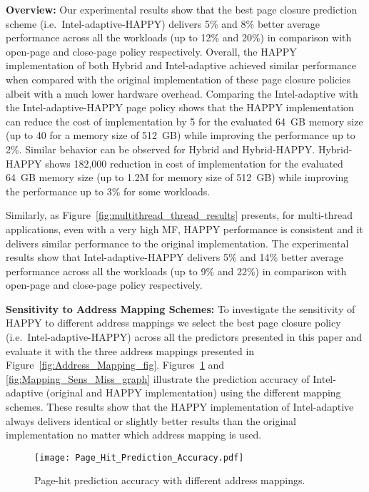 {\bf Overview:} Our experimental results show that the best page closure prediction scheme (i.e.\ Intel-adaptive-HAPPY) delivers 5\% and 8\% better average performance across all the workloads (up to 12\% and 20\%) in comparison with open-page and close-page policy respectively. Overall, the HAPPY implementation of both Hybrid and Intel-adaptive achieved similar performance when compared with the original implementation of these page closure policies albeit with a much lower hardware overhead. Comparing the Intel-adaptive with the Intel-adaptive-HAPPY page policy shows that the HAPPY implementation can reduce the cost of implementation by 5 for the evaluated 64~GB memory size (up to 40 for a memory size of 512~GB) while improving the performance up to 2\%. Similar behavior can be observed for Hybrid and Hybrid-HAPPY. Hybrid-HAPPY shows 182,000 reduction in cost of implementation for the evaluated 64~GB memory size (up to 1.2M for memory size of 512~GB) while improving the performance up to 3\% for some workloads.

Similarly, as Figure~\ref{fig:multithread_thread_results} presents, for multi-thread applications, even with a very high MF, HAPPY performance is consistent and it delivers similar performance to the original implementation. The experimental results show that Intel-adaptive-HAPPY delivers 5\% and 14\% better average performance across all the workloads (up to 9\% and 22\%) in comparison with open-page and close-page policy respectively. 








{\bf Sensitivity to Address Mapping Schemes:} To investigate the sensitivity of HAPPY to different address mappings we select the best page closure policy (i.e.\ Intel-adaptive-HAPPY) across all the predictors presented in this paper and evaluate it with the three address mappings presented in Figure~\ref{fig:Address_Mapping_fig}. Figures~\ref{fig:Mapping_Sens_Hit_graph} and  \ref{fig:Mapping_Sens_Miss_graph} illustrate the prediction accuracy of Intel-adaptive (original and HAPPY implementation) using the different mapping schemes. These results show that the HAPPY implementation of Intel-adaptive always delivers identical or slightly better results than the original implementation no matter which address mapping is used.

\begin{figure}[!htb]
\centering
\texttt{[image: Page\_Hit\_Prediction\_Accuracy.pdf]}
\caption{Page-hit prediction accuracy with different address mappings.}
\label{fig:Mapping_Sens_Hit_graph}
\end{figure}


